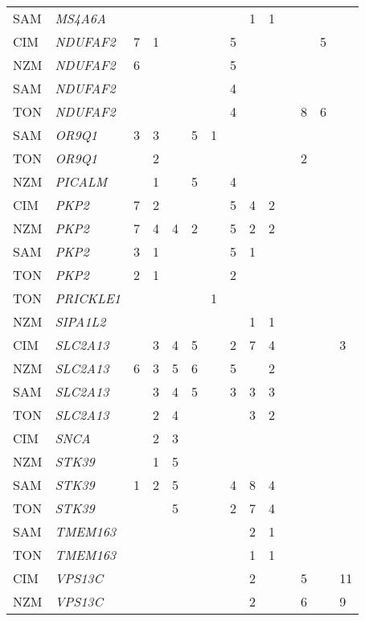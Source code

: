 \documentclass[]{report}
\begin{document}
\begin{ThreePartTable}
\begin{longtable}[t]{llllllllllllll}
SAM & \em{MS4A6A} &  &  &  &  &  &  & 1 & 1 &  &  &  & \\
CIM & \em{NDUFAF2} & 7 & 1 &  &  &  & 5 &  &  &  &  & 5 & \\
NZM & \em{NDUFAF2} & 6 &  &  &  &  & 5 &  &  &  &  &  & \\
SAM & \em{NDUFAF2} &  &  &  &  &  & 4 &  &  &  &  &  & \\
TON & \em{NDUFAF2} &  &  &  &  &  & 4 &  &  &  & 8 & 6 & \\
SAM & \em{OR9Q1} & 3 & 3 &  & 5 & 1 &  &  &  &  &  &  & \\
TON & \em{OR9Q1} &  & 2 &  &  &  &  &  &  &  & 2 &  & \\
NZM & \em{PICALM} &  & 1 &  & 5 &  & 4 &  &  &  &  &  & \\
CIM & \em{PKP2} & 7 & 2 &  &  &  & 5 & 4 & 2 &  &  &  & \\
NZM & \em{PKP2} & 7 & 4 & 4 & 2 &  & 5 & 2 & 2 &  &  &  & \\
SAM & \em{PKP2} & 3 & 1 &  &  &  & 5 & 1 &  &  &  &  & \\
TON & \em{PKP2} & 2 & 1 &  &  &  & 2 &  &  &  &  &  & \\
TON & \em{PRICKLE1} &  &  &  &  & 1 &  &  &  &  &  &  & \\
NZM & \em{SIPA1L2} &  &  &  &  &  &  & 1 & 1 &  &  &  & \\
CIM & \em{SLC2A13} &  & 3 & 4 & 5 &  & 2 & 7 & 4 &  &  &  & 3\\
NZM & \em{SLC2A13} & 6 & 3 & 5 & 6 &  & 5 &  & 2 &  &  &  & \\
SAM & \em{SLC2A13} &  & 3 & 4 & 5 &  & 3 & 3 & 3 &  &  &  & \\
TON & \em{SLC2A13} &  & 2 & 4 &  &  &  & 3 & 2 &  &  &  & \\
CIM & \em{SNCA} &  & 2 & 3 &  &  &  &  &  &  &  &  & \\
NZM & \em{STK39} &  & 1 & 5 &  &  &  &  &  &  &  &  & \\
SAM & \em{STK39} & 1 & 2 & 5 &  &  & 4 & 8 & 4 &  &  &  & \\
TON & \em{STK39} &  &  & 5 &  &  & 2 & 7 & 4 &  &  &  & \\
SAM & \em{TMEM163} &  &  &  &  &  &  & 2 & 1 &  &  &  & \\
TON & \em{TMEM163} &  &  &  &  &  &  & 1 & 1 &  &  &  & \\
CIM & \em{VPS13C} &  &  &  &  &  &  & 2 &  &  & 5 &  & 11\\
NZM & \em{VPS13C} &  &  &  &  &  &  & 2 &  &  & 6 &  & 9\\*
\end{longtable}
\end{ThreePartTable}
\end{document}
